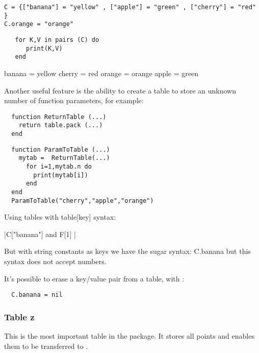 \begin{mybox}
\begin{Verbatim}
C = {["banana"] = "yellow" , ["apple"] = "green" , ["cherry"] = "red" }
C.orange = "orange"
\end{Verbatim}
\end{mybox}

\begin{mybox}
\begin{Verbatim}
   for K,V in pairs (C) do
      print(K,V)
   end
\end{Verbatim}
\end{mybox}

banana = yellow
cherry = red
orange = orange
apple  = green

Another useful feature is the ability to create a table to store an unknown number of function parameters, for example:

\begin{mybox}
\begin{Verbatim}
  function ReturnTable (...)
    return table.pack (...) 
  end 
\end{Verbatim}
\end{mybox}

\begin{mybox}
\begin{Verbatim}
  function ParamToTable (...)
    mytab =  ReturnTable(...)
      for i=1,mytab.n do
        print(mytab[i])
      end
  end
  ParamToTable("cherry","apple","orange")  
\end{Verbatim}
\end{mybox}


Using tables with table[key] syntax:

|C["banana"] and F[1]  |

But with  string constants as keys we have the sugar syntax:
C.banana but this syntax does not accept numbers.

It's possible to erase a key/value pair from a table, with :

\begin{mybox}
\begin{Verbatim}
  C.banana = nil 
\end{Verbatim}
\end{mybox}

\subsubsection{Table z} %
\label{ssub:table_z}
This is the most important table in the package. It stores all points and enables them to be transferred to \TIKZ{}.

